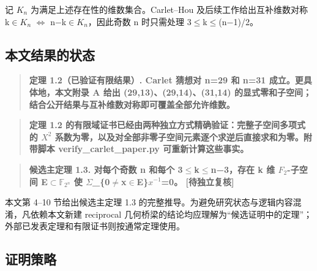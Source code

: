 \documentclass[11pt]{ctexart}
\begin{document}
记 \ensuremath{K_{n}} 为满足上述存在性的维数集合。Carlet–Hou 及后续工作给出互补维数对称 k\ensuremath{\in}\ensuremath{K_{n}} \ensuremath{\Longleftrightarrow} n−k\ensuremath{\in}\ensuremath{K_{n}}，因此奇数 n 时只需处理 3\ensuremath{\le}k\ensuremath{\le}(n−1)/2。

\subsection{本文结果的状态}

\begin{quote}\textbf{定理 1.2（已验证有限结果）. Carlet 猜想对 n=29 和 n=31 成立。更具体地，本文附录 A 给出 (29,13)、(29,14)、(31,14) 的显式零和子空间；结合公开结果与互补维数对称即可覆盖全部允许维数。}\end{quote}

\begin{quote}\textbf{定理 1.2 的有限域证书已经由两种独立方式精确验证：完整子空间多项式的 \ensuremath{X^2} 系数为零，以及对全部非零子空间元素逐个求逆后直接求和为零。附带脚本 verify\_carlet\_paper.py 可重新计算这些事实。}\end{quote}

\begin{quote}\textbf{候选主定理 1.3. 对每个奇数 n 和每个 3\ensuremath{\le}k\ensuremath{\le}n−3，存在 k 维 \ensuremath{F_2}-子空间 E\ensuremath{\subset}\ensuremath{\mathbb F_{2^n}} 使 \ensuremath{\Sigma}\_\{0\ensuremath{\ne}x\ensuremath{\in}E\}\ensuremath{x^{-1}}=0。  [待独立复核]}\end{quote}

本文第 4–10 节给出候选主定理 1.3 的完整推导。为避免研究状态与逻辑内容混淆，凡依赖本文新建 reciprocal 几何桥梁的结论均应理解为“候选证明中的定理”；外部已发表定理和有限证书则按通常定理使用。

\subsection{证明策略}
\end{document}
